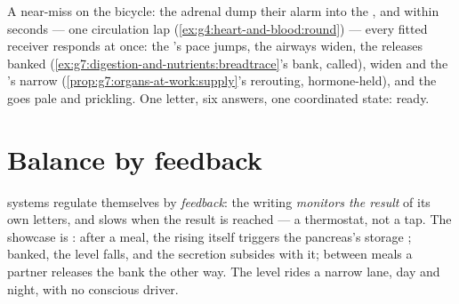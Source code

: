 \begin{example}\label{ex:g8:hormonal-communication:alarm}
A near-miss on the bicycle: the adrenal  dump
their alarm  into the , and within seconds
--- one circulation lap
(\cref{ex:g4:heart-and-blood:round}) --- every fitted
receiver responds at once: the 's pace jumps, the
airways widen, the  releases banked 
(\cref{ex:g7:digestion-and-nutrients:breadtrace}'s
bank, called),   widen and the 's narrow
(\cref{prop:g7:organs-at-work:supply}'s rerouting,
hormone-held), and the  goes pale and prickling.
One letter, six answers, one coordinated state: ready.
\end{example}

\section{Balance by feedback}

\begin{proposition}\label{prop:g8:hormonal-communication:feedback}
 systems regulate themselves by
\emph{feedback}: the writing 
\emph{monitors the result} of its own letters, and slows
when the result is reached --- a thermostat, not a tap.
The showcase is  : after a meal, the rising
 itself triggers the pancreas's storage ;
 banked, the level falls, and the secretion
subsides with it; between meals a partner 
releases the bank the other way. The level rides a
narrow lane, day and night, with no conscious driver.
\end{proposition}
\admitted

